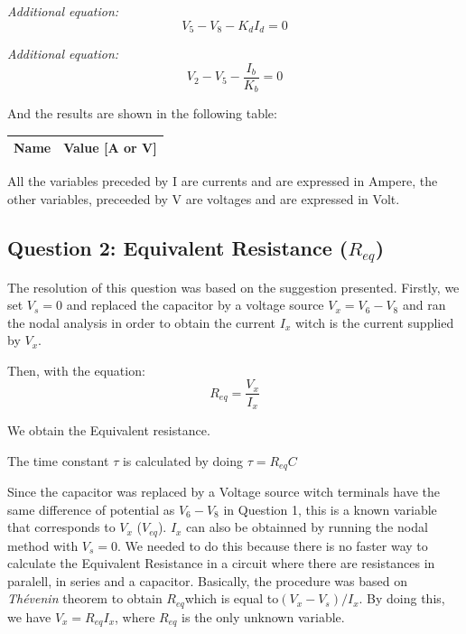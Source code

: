 \emph{Additional equation:}
\begin{equation}
     V_5 - V_8 - K_dI_d = 0
\end{equation}\par

\emph{Additional equation:}
\begin{equation}
     V_2 - V_5 - \frac{I_b}{K_b} = 0
\end{equation}\par

And the results are shown in the following table:

\begin{center}
  \begin{tabular}{ | c | c | }
    \hline    
    {\bf Name} & {\bf Value [A or V]} \\ \hline
    
    \hline
  \end{tabular}
\end{center}
All the variables preceded by I are currents and are expressed in Ampere, the other variables, preceeded by V are voltages and are expressed in Volt.



\subsection{Question 2: Equivalent Resistance ($R_{eq}$)}
The resolution of this question was based on the suggestion presented. Firstly, we set $V_s =0$ and replaced the capacitor by a voltage source $V_x = V_6 - V_8$ and ran the nodal analysis in order to obtain the current $I_x$ witch is the current supplied by $V_x$.\par
Then, with the equation: 
\begin{equation}
     R_{eq} = \frac{V_x}{I_x}
\end{equation}\par
We obtain the Equivalent resistance. \par 
The time constant $\tau$ is calculated by doing $\tau=R_{eq}C$\par
 Since the capacitor was replaced by a Voltage source witch terminals have the same difference of potential as $V_6 - V_8$ in Question 1, this is a known variable that corresponds to $V_x$ ($V_{eq}$). $I_x$ can also be obtainned by running the nodal method with $V_s = 0$. We needed to do this because there is no faster way to calculate the Equivalent Resistance in a circuit where there are resistances in paralell, in series and a capacitor. Basically, the procedure was based on \emph{Thévenin} theorem to obtain $R_{eq}$which is equal to$(V_{x}-V_{s})/I_{x} $. By doing this, we have $V_{x}=R_{eq}I_x$, where $R_{eq}$ is the only unknown variable. \par

